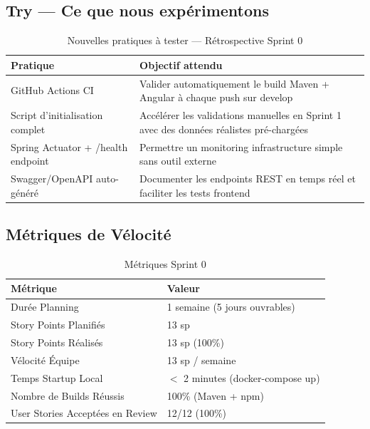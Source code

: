 \documentclass[12pt,a4paper]{report}
\begin{document}
\subsection{Try — Ce que nous expérimentons}

\begin{table}[H]
\centering
\caption{Nouvelles pratiques à tester — Rétrospective Sprint 0}
\begin{tabular}{|p{4cm}|p{9.5cm}|}
\hline
\textbf{Pratique} & \textbf{Objectif attendu} \\
\hline
GitHub Actions CI & Valider automatiquement le build Maven + Angular à chaque push sur develop \\
\hline
Script d'initialisation complet & Accélérer les validations manuelles en Sprint 1 avec des données réalistes pré-chargées \\
\hline
Spring Actuator + /health endpoint & Permettre un monitoring infrastructure simple sans outil externe \\
\hline
Swagger/OpenAPI auto-généré & Documenter les endpoints REST en temps réel et faciliter les tests frontend \\
\hline
\end{tabular}
\end{table}

\subsection{Métriques de Vélocité}

\begin{table}[H]
\centering
\caption{Métriques Sprint 0}
\begin{tabular}{|p{4cm}|p{10cm}|}
\hline
\textbf{Métrique} & \textbf{Valeur} \\
\hline
Durée Planning & 1 semaine (5 jours ouvrables) \\
\hline
Story Points Planifiés & 13 sp \\
\hline
Story Points Réalisés & 13 sp (100\%) \\
\hline
Vélocité Équipe & 13 sp / semaine \\
\hline
Temps Startup Local & $<$ 2 minutes (docker-compose up) \\
\hline
Nombre de Builds Réussis & 100\% (Maven + npm) \\
\hline
User Stories Acceptées en Review & 12/12 (100\%) \\
\hline
\end{tabular}
\end{table}
\end{document}
